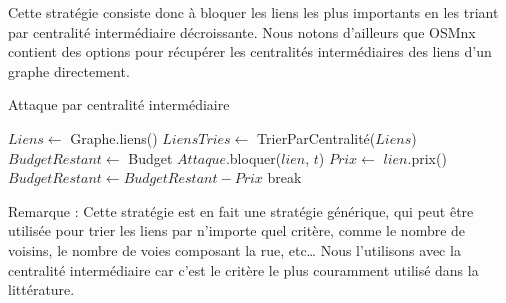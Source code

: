 Cette stratégie consiste donc à bloquer les liens les plus importants en les triant par centralité intermédiaire décroissante.
Nous notons d'ailleurs que OSMnx contient des options pour récupérer les centralités intermédiaires des liens d'un graphe directement.
\begin{algorithm}[H]
\caption{Attaque par centralité intermédiaire}
\begin{algorithmic}
\State $Liens \gets$ Graphe.liens()
\State $LiensTries \gets$ TrierParCentralité($Liens$)
    \State $BudgetRestant \gets$ Budget
        \State $Attaque$.bloquer($lien$, $t$)
        \State $Prix \gets$ $lien$.prix()
        \State $BudgetRestant \gets BudgetRestant - Prix$
            \State break
        \EndIf
    \EndFor
\EndFor
\end{algorithmic}
\end{algorithm}

Remarque : Cette stratégie est en fait une stratégie générique, qui peut être utilisée pour trier les liens par n'importe quel critère, comme le nombre de voisins, le nombre de voies composant la rue, etc\dots
Nous l'utilisons avec la centralité intermédiaire car c'est le critère le plus couramment utilisé dans la littérature.